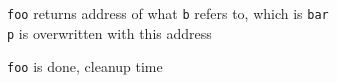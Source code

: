 \begin{frame}
\begin{overprint}
    \begin{center}
      {\tt foo} returns address of what {\tt b} refers to, which is {\tt bar} \\
      {\tt p} is overwritten with this address
    \end{center}

    \begin{center}
      {\tt foo} is done, cleanup time
    \end{center}
    
  \end{overprint}
\end{frame}



